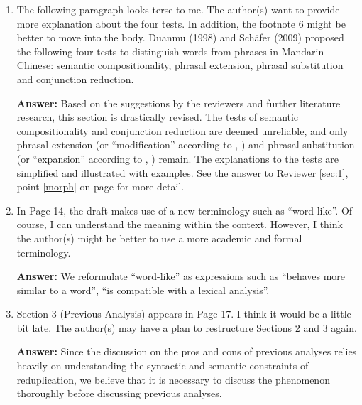 \documentclass[fleqn,twoside]{article}
\begin{document}
\begin{enumerate}
\item
The following paragraph looks terse to me. The author(s) want to provide more explanation about the four tests. In addition, the footnote 6 might be better to move into the body.
Duanmu (1998) and Schäfer (2009) proposed the following four tests to distinguish words from phrases
in Mandarin Chinese: semantic compositionality, phrasal extension, phrasal substitution and
conjunction reduction.

\textbf{Answer:} 
Based on the suggestions by the reviewers and further literature research, this section is drastically revised.
The tests of semantic compositionality and conjunction reduction are deemed unreliable,
and only phrasal extension (or ``modification'' according to \citealt[32]{Dai1992}, \citeyear[117]{Dai1998})
and phrasal substitution (or ``expansion'' according to \citealt[33]{Dai1992}, \citeyear[117--120]{Dai1998}) remain.
The explanations to the tests are simplified and illustrated with examples.
See the answer to Reviewer \ref{sec:1}, point \ref{morph} on page \pageref{morph} for more detail.


\item
In Page 14, the draft makes use of a new terminology such as ``word-like''. Of course, I can understand the meaning within the context. However, I think the author(s) might be better to use a more academic and formal terminology.

\textbf{Answer:} We reformulate ``word-like'' as expressions such as ``behaves more similar to a word'', ``is compatible with a lexical analysis''.


\item
Section 3 (Previous Analysis) appears in Page 17. I think it would be a little bit late. The author(s) may have a plan to restructure Sections 2 and 3 again.

\noindent
\textbf{Answer: }Since the discussion on the pros and cons of previous analyses relies heavily on understanding the syntactic and semantic constraints of reduplication, we believe that it is necessary to discuss the phenomenon thoroughly before discussing previous analyses.


\end{enumerate}
\end{document}
